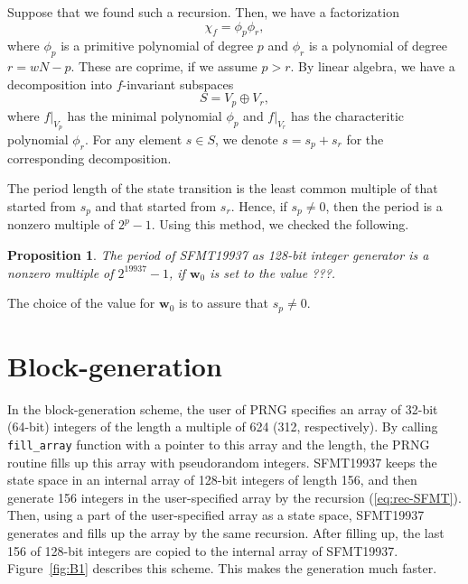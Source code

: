 \documentclass[acmnow]{acmtrans2m}
\newtheorem{proposition}[theorem]{Proposition}
\def\bw{{{\mathbf w}}}
\begin{document}
Suppose that we found such a recursion. Then, 
we have a factorization
$$
\chi_f=\phi_p \phi_r,
$$
where $\phi_p$ is a primitive polynomial of degree $p$
and $\phi_r$ is a polynomial of degree $r=wN-p$. These are coprime, 
if we assume $p>r$.
By linear algebra, we have a decomposition into $f$-invariant subspaces
$$
S=V_p \oplus V_r,
$$
where $f|_{V_p}$ has the minimal polynomial $\phi_p$
and $f|_{V_r}$ has the characteritic polynomial $\phi_r$.
For any element $s \in S$, we denote $s=s_p+s_r$ for the corresponding
decomposition. 

The period length of the state transition is the least common multiple
of that started from $s_p$ and that started from $s_r$. Hence, 
if $s_p \neq 0$, then the period is a nonzero multiple of $2^p-1$. 
Using this method, we checked the following. 
\begin{proposition}
The period of SFMT19937 as 128-bit integer generator is 
a nonzero multiple of $2^{19937}-1$, if $\bw_0$ is set to 
the value ???.
\end{proposition}
The choice of the value for $\bw_0$ is to assure that $s_p\neq 0$.

\section{Block-generation}\label{sec:block}
In the block-generation scheme, 
the user of PRNG specifies an array
of 32-bit (64-bit) integers of the length
a multiple of 624 (312, respectively).
By calling {\tt fill\_array} function 
with a pointer to this array and the length, 
the PRNG routine fills up this array with
pseudorandom integers. SFMT19937 keeps the state
space in an internal array of 128-bit integers of length 156,
and then generate 156 integers in the user-specified 
array by the recursion (\ref{eq:rec-SFMT}). 
Then, using a part of the user-specified array as a 
state space, SFMT19937 generates and fills up the array
by the same recursion. After filling up, the last
156 of 128-bit integers are copied to the internal array
of SFMT19937. Figure~\ref{fig:B1} describes this scheme.
This makes the generation much faster.
\end{document}
